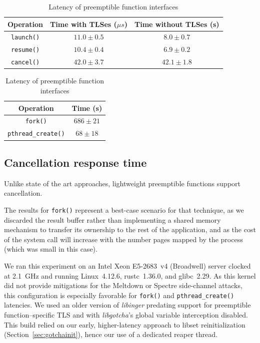 \begin{table}
	\begin{minipage}{\textwidth}
	\centering
	\begin{tabular}{c | c c}
	Operation & Time with TLSes ($\mu{s}$) & Time without TLSes (\textmu{}s) \\
	\hline
	\texttt{launch()} & $11.0 \pm 0.5$ & $8.0 \pm 0.7$ \\
	\texttt{resume()} & $10.4 \pm 0.4$ & $6.9 \pm 0.2$ \\
	\texttt{cancel()} & $42.0 \pm 3.7$ & $42.1 \pm 1.8$ \\
	\end{tabular}
	\end{minipage}

	\begin{minipage}{\textwidth}
	\vspace{12pt}
	\centering
	\begin{tabular}{c | c}
	Operation & Time (\textmu{}s) \\
	\hline
	\texttt{fork()} & $686 \pm 21$ \\
	\texttt{pthread\_create()} & \;\;$68 \pm 18$
	\end{tabular}
	\end{minipage}
\caption{Latency of preemptible function interfaces}
\label{tab:libinger}
\end{table}


\subsection{Cancellation response time}
\label{sec:libinger:bombs}

Unlike state of the art approaches, lightweight preemptible functions support
cancellation.

\begin{sloppypar}

\hspace{-1.5em}
The
results for \texttt{fork()} represent a best-case scenario for that technique, as we
discarded the result buffer rather than implementing a shared memory mechanism to
transfer its ownership to the rest of the application, and as the cost of
the system call will increase with the number pages mapped by the process (which was
small in this case).
\end{sloppypar}



We ran this experiment on an Intel Xeon E5-2683~v4 (Broadwell) server clocked at
2.1~GHz and running Linux~4.12.6, rustc~1.36.0, and glibc~2.29.  As this kernel did
not provide mitigations for the Meltdown or Spectre side-channel attacks, this
configuration is especially favorable for \texttt{fork()} and
\texttt{pthread\_create()} latencies.  We used an older version of \textit{libinger}
predating support for preemptible function--specific TLS and with
\textit{libgotcha}'s global variable interception disabled.  This build relied on our
early, higher-latency approach to libset reinitialization
(Section~\ref{sec:gotchainit}), hence our use of a dedicated reaper thread.
